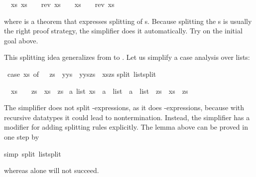 \begin{isabellebody}
%
\begin{isamarkuptxt}%
\noindent
\begin{isabelle}%
\ {}{\isachardot}\ {\isasymforall}xs{\isachardot}\ {\isacharparenleft}xs\ {\isacharequal}\ {\isacharbrackleft}{\isacharbrackright}\ {\isasymlongrightarrow}\ rev\ xs\ {\isacharequal}\ {\isacharbrackleft}{\isacharbrackright}{\isacharparenright}\ {\isasymand}\ {\isacharparenleft}xs\ {\isasymnoteq}\ {\isacharbrackleft}{\isacharbrackright}\ {\isasymlongrightarrow}\ rev\ xs\ {\isasymnoteq}\ {\isacharbrackleft}{\isacharbrackright}{\isacharparenright}%
\end{isabelle}
where  is a theorem that expresses splitting of
s. Because
splitting the s is usually the right proof strategy, the
simplifier does it automatically.  Try 
on the initial goal above.

This splitting idea generalizes from  to .
Let us simplify a case analysis over lists:%
\end{isamarkuptxt}%
\isamarkuptrue%
\isamarkupfalse%
\ {\isachardoublequote}{\isacharparenleft}case\ xs\ of\ {\isacharbrackleft}{\isacharbrackright}\ {\isasymRightarrow}\ zs\ {\isacharbar}\ y{\isacharhash}ys\ {\isasymRightarrow}\ y{\isacharhash}{\isacharparenleft}ys{\isacharat}zs{\isacharparenright}{\isacharparenright}\ {\isacharequal}\ xs{\isacharat}zs{\isachardoublequote}\isanewline
\isamarkupfalse%
split\ list{\isachardot}split{\isacharparenright}\isamarkupfalse%
%
\begin{isamarkuptxt}%
\begin{isabelle}%
\ {}{\isachardot}\ {\isacharparenleft}xs\ {\isacharequal}\ {\isacharbrackleft}{\isacharbrackright}\ {\isasymlongrightarrow}\ zs\ {\isacharequal}\ xs\ {\isacharat}\ zs{\isacharparenright}\ {\isasymand}\isanewline
{}a\ list{\isachardot}\ xs\ {\isacharequal}\ a\ {\isacharhash}\ list\ {\isasymlongrightarrow}\ a\ {\isacharhash}\ list\ {\isacharat}\ zs\ {\isacharequal}\ xs\ {\isacharat}\ zs{\isacharparenright}%
\end{isabelle}
The simplifier does not split
-expressions, as it does -expressions, 
because with recursive datatypes it could lead to nontermination.
Instead, the simplifier has a modifier
for adding splitting rules explicitly.  The
lemma above can be proved in one step by%
\end{isamarkuptxt}%
\isamarkuptrue%
\isamarkupfalse%
\isamarkupfalse%
simp\ split{\isacharcolon}\ list{\isachardot}split{\isacharparenright}\isamarkupfalse%
\isamarkupfalse%
%
\begin{isamarkuptext}%
\noindent
whereas  alone will not succeed.


\end{isamarkuptext}
\end{isabellebody}

